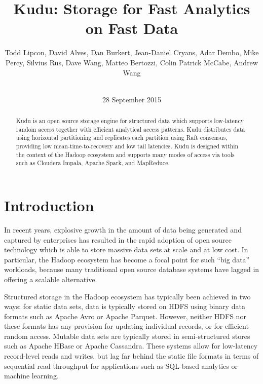 \documentclass{vldb}
\begin{document}
\title{Kudu: Storage for Fast Analytics on Fast Data
}
\author{
  \alignauthor Todd Lipcon, David Alves, Dan Burkert, Jean-Daniel Cryans, Adar Dembo, Mike Percy, Silvius Rus, Dave Wang,
  Matteo Bertozzi, Colin Patrick McCabe, Andrew Wang\\
  \\
}

\date{28 September 2015}

\maketitle

\begin{abstract}
Kudu is an open source storage engine for structured data which supports low-latency random access
together with efficient analytical access patterns. Kudu distributes data using
horizontal partitioning and replicates each partition using Raft consensus, providing low
mean-time-to-recovery and low tail latencies. Kudu is designed within the context of the Hadoop
ecosystem and supports many modes of access via tools such as Cloudera Impala\cite{impala},
Apache Spark\cite{spark}, and MapReduce\cite{mapreduce}.
\end{abstract}

\section{Introduction}
\label{sec:introduction}
In recent years, explosive growth in the amount of data being generated and captured by
enterprises has resulted in the rapid adoption of open source technology which is able to
store massive data sets at scale and at low cost. In particular, the Hadoop ecosystem has become a focal
point for such ``big data'' workloads, because many traditional open source database systems have
lagged in offering a scalable alternative.

Structured storage in the Hadoop ecosystem has typically been achieved in two ways: for static data sets,
data is typically stored on HDFS using binary data formats such as Apache Avro\cite{avro} or
Apache Parquet\cite{parquet}. However, neither HDFS nor these formats has any provision for updating
individual records, or for efficient random access. Mutable data sets are typically stored in
semi-structured stores such as Apache HBase\cite{hbase} or Apache Cassandra\cite{cassandra}. These systems allow for low-latency
record-level reads and writes, but lag far behind the static file formats in terms of sequential
read throughput for applications such as SQL-based analytics or machine learning.
\end{document}
